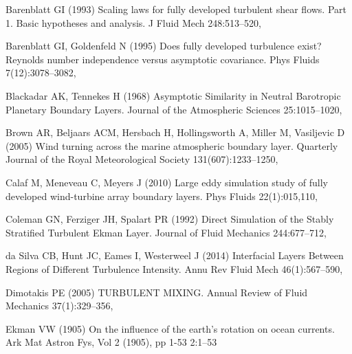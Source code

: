 \documentclass[smallcondensed,final]{svjour3}
\begin{document}
\begin{thebibliography}{57}
Barenblatt GI (1993) Scaling laws for fully developed turbulent shear flows.
  {{Part}} 1. {{Basic}} hypotheses and analysis. J Fluid Mech 248:513--520,

Barenblatt GI, Goldenfeld N (1995) Does fully developed turbulence exist?
  {{Reynolds}} number independence versus asymptotic covariance. Phys Fluids
  7(12):3078--3082, 

Blackadar AK, Tennekes H (1968) Asymptotic {{Similarity}} in {{Neutral
  Barotropic Planetary Boundary Layers}}. Journal of the Atmospheric Sciences
  25:1015--1020, 

Brown AR, Beljaars ACM, Hersbach H, Hollingsworth A, Miller M, Vasiljevic D
  (2005) Wind turning across the marine atmospheric boundary layer. Quarterly
  Journal of the Royal Meteorological Society 131(607):1233--1250,

Calaf M, Meneveau C, Meyers J (2010) Large eddy simulation study of fully
  developed wind-turbine array boundary layers. Phys Fluids 22(1):015,110,

Coleman GN, Ferziger JH, Spalart PR (1992) Direct {{Simulation}} of the
  {{Stably Stratified Turbulent Ekman Layer}}. Journal of Fluid Mechanics
  244:677--712, 

{da Silva} CB, Hunt JC, Eames I, Westerweel J (2014) Interfacial {{Layers
  Between Regions}} of {{Different Turbulence Intensity}}. Annu Rev Fluid Mech
  46(1):567--590, 

Dimotakis PE (2005) {{TURBULENT MIXING}}. Annual Review of Fluid Mechanics
  37(1):329--356, 

Ekman VW (1905) On the influence of the earth's rotation on ocean currents. Ark
  Mat Astron Fys, Vol 2 (1905), pp 1-53 2:1--53


\end{thebibliography}
\end{document}
